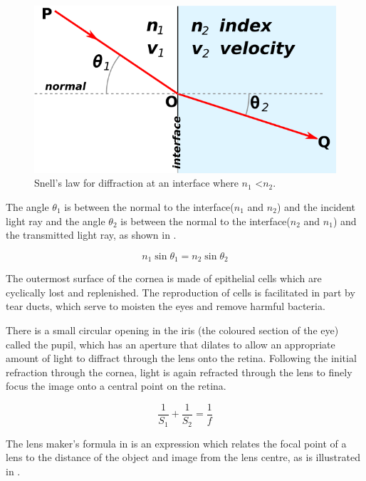 \begin{figure}[htbp]
 \centering
   \includegraphics{figures/snells}
 \caption{Snell's law for diffraction at an interface where $n_1$ \textless $n_2$.\cite{wikisnell}}
 \label{fig:snell}
\end{figure}

The angle $\theta_1$ is between the normal to the interface($n_1$ and $n_2$)
and the incident light ray and the angle $\theta_2$ is between the normal to
the interface($n_2$ and $n_1$) and the transmitted light ray, as shown in .

\begin{equation}
n_1\sin\theta_1=n_2\sin\theta_2
\label{eq:refractive}
\end{equation}

The outermost surface of the cornea is made of epithelial cells which
are cyclically lost and replenished.
\cite{jester1999cellular,hassell2010molecular} The reproduction
of cells is facilitated in part by tear ducts, which serve to
moisten the eyes and remove harmful bacteria.\cite{holly1977tear}

There is a small circular opening in the iris (the coloured section of
the eye) called the pupil, which has an aperture that dilates to allow
an appropriate amount of light to diffract through the lens onto the retina.
Following the initial refraction through the cornea, light is again
refracted through the lens to finely focus the image onto a central point
on the retina.

\begin{equation}
\frac{1}{S_1} + \frac{1}{S_2} = \frac{1}{f}
\label{eq:lens_makers}
\end{equation}

The lens maker’s formula in  is an expression which relates the
focal point of a lens to the distance of the object and image from the lens centre,
as is illustrated in .

